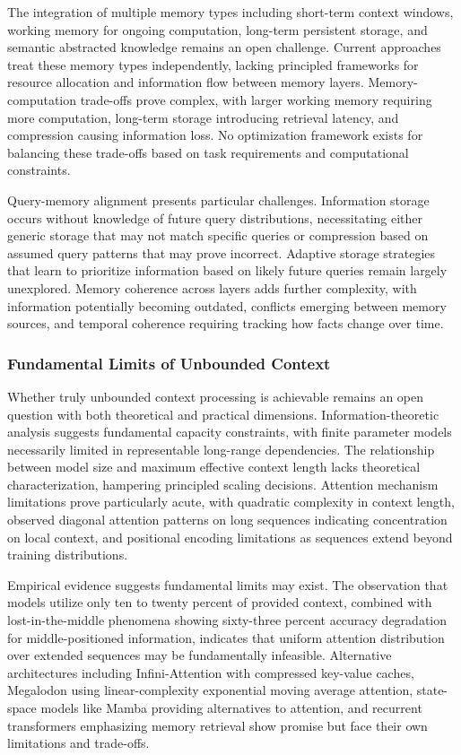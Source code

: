 \documentclass[11pt,letterpaper]{article}
\begin{document}
The integration of multiple memory types including short-term context windows, working memory for ongoing computation, long-term persistent storage, and semantic abstracted knowledge remains an open challenge. Current approaches treat these memory types independently, lacking principled frameworks for resource allocation and information flow between memory layers. Memory-computation trade-offs prove complex, with larger working memory requiring more computation, long-term storage introducing retrieval latency, and compression causing information loss. No optimization framework exists for balancing these trade-offs based on task requirements and computational constraints.

Query-memory alignment presents particular challenges. Information storage occurs without knowledge of future query distributions, necessitating either generic storage that may not match specific queries or compression based on assumed query patterns that may prove incorrect. Adaptive storage strategies that learn to prioritize information based on likely future queries remain largely unexplored. Memory coherence across layers adds further complexity, with information potentially becoming outdated, conflicts emerging between memory sources, and temporal coherence requiring tracking how facts change over time.

\subsubsection{Fundamental Limits of Unbounded Context}

Whether truly unbounded context processing is achievable remains an open question with both theoretical and practical dimensions. Information-theoretic analysis suggests fundamental capacity constraints, with finite parameter models necessarily limited in representable long-range dependencies. The relationship between model size and maximum effective context length lacks theoretical characterization, hampering principled scaling decisions. Attention mechanism limitations prove particularly acute, with quadratic complexity in context length, observed diagonal attention patterns on long sequences indicating concentration on local context, and positional encoding limitations as sequences extend beyond training distributions.

Empirical evidence suggests fundamental limits may exist. The observation that models utilize only ten to twenty percent of provided context, combined with lost-in-the-middle phenomena showing sixty-three percent accuracy degradation for middle-positioned information, indicates that uniform attention distribution over extended sequences may be fundamentally infeasible. Alternative architectures including Infini-Attention with compressed key-value caches, Megalodon using linear-complexity exponential moving average attention, state-space models like Mamba providing alternatives to attention, and recurrent transformers emphasizing memory retrieval show promise but face their own limitations and trade-offs.
\end{document}
